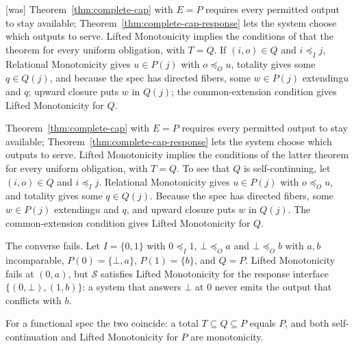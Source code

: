 \documentclass[sigconf]{cidr-2027}
\theoremstyle{remark}
\newcommand{\InputOrd}{\preceq_I}
\newcommand{\OutputOrd}{\preceq_O}
\newcommand{\outrelpart}{extending\xspace}    %
\newcommand{\Spec}{\mathcal{S}}
\newcommand{\fiber}[1]{P(#1)}
\begin{document}
{\footnotesize\color{black!50}\noindent\textsf{[was]} Theorem~\ref{thm:complete-cap} with $E=P$ requires every permitted output to
stay available; Theorem~\ref{thm:complete-cap-response} lets the system choose
which outputs to serve.  Lifted Monotonicity implies the conditions of that
the theorem for every uniform obligation, with $T=Q$.  If $(i,o)\in Q$ and $i\InputOrd j$, Relational Monotonicity gives
$u\in\fiber{j}$ with $o\OutputOrd u$, totality gives some $q\in Q(j)$,
and because the spec has directed fibers, some $w\in\fiber{j}$
\outrelpart $u$ and $q$; upward
closure puts $w$ in $Q(j)$; the common-extension condition gives Lifted Monotonicity for $Q$.\par}

\color{blue!70!black}Theorem~\ref{thm:complete-cap} with $E=P$ requires every permitted output to
stay available; Theorem~\ref{thm:complete-cap-response} lets the system choose
which outputs to serve.  Lifted Monotonicity implies the conditions of the
latter theorem for every uniform obligation, with $T=Q$.  To see that $Q$ is
self-continuing, let $(i,o)\in Q$ and $i\InputOrd j$.  Relational Monotonicity
gives $u\in\fiber{j}$ with $o\OutputOrd u$, and totality gives some $q\in
Q(j)$.  Because the spec has directed fibers, some $w\in\fiber{j}$
\outrelpart $u$ and $q$, and upward closure puts $w$ in $Q(j)$.  The
common-extension condition gives Lifted Monotonicity for $Q$.\color{black}

The converse fails.  Let $I=\{0,1\}$ with $0\InputOrd 1$, $\bot\OutputOrd a$ and
$\bot\OutputOrd b$ with $a,b$ incomparable, $\fiber{0}=\{\bot,a\}$,
$\fiber{1}=\{b\}$, and $Q=P$.  Lifted Monotonicity fails at $(0,a)$, but $\Spec$
satisfies Lifted Monotonicity for the response interface $\{(0,\bot),(1,b)\}$: a system that
answers $\bot$ at $0$ never emits the output that conflicts with $b$.

For a functional spec the two coincide: a total $T\subseteq Q\subseteq
P$ equals $P$, and both self-continuation and Lifted Monotonicity for $P$ are
monotonicity.
\end{document}
